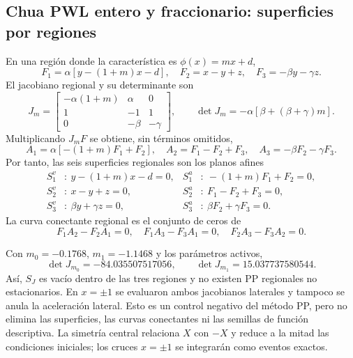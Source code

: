 \subsection{Chua PWL entero y fraccionario: superficies por regiones}
\label{subsec:casegt-chua-pwl}

En una región donde la característica es $\phi(x)=mx+d$,
\begin{equation}
 F_1=\alpha[y-(1+m)x-d],\quad
 F_2=x-y+z,\quad F_3=-\beta y-\gamma z.
 \label{casegt:eq:chua-pwl-field}
\end{equation}
El jacobiano regional y su determinante son
\begin{equation}
 J_m=
 \begin{bmatrix}
 -\alpha(1+m)&\alpha&0\\
 1&-1&1\\
 0&-\beta&-\gamma
 \end{bmatrix},
 \qquad
 \det J_m=-\alpha[\beta+(\beta+\gamma)m].
 \label{casegt:eq:chua-pwl-J}
\end{equation}
Multiplicando $J_mF$ se obtiene, sin términos omitidos,
\begin{equation}
 A_1=\alpha[-(1+m)F_1+F_2],\quad
 A_2=F_1-F_2+F_3,\quad
 A_3=-\beta F_2-\gamma F_3.
 \label{casegt:eq:chua-pwl-A}
\end{equation}
Por tanto, las seis superficies regionales son los planos afines
\begin{align}
 S_1^v&:\ y-(1+m)x-d=0,&
 S_1^a&:\ -(1+m)F_1+F_2=0,\nonumber\\
 S_2^v&:\ x-y+z=0,&
 S_2^a&:\ F_1-F_2+F_3=0,\\
 S_3^v&:\ \beta y+\gamma z=0,&
 S_3^a&:\ \beta F_2+\gamma F_3=0.
 \label{casegt:eq:chua-pwl-surfaces}
\end{align}
La curva conectante regional es el conjunto de ceros de
\begin{equation}
 F_1A_2-F_2A_1=0,
 \quad F_1A_3-F_3A_1=0,
 \quad F_2A_3-F_3A_2=0.
 \label{casegt:eq:chua-pwl-CC}
\end{equation}

Con $m_0=-0.1768$, $m_1=-1.1468$ y los parámetros activos,
\begin{equation}
 \det J_{m_0}=-84.035507517056,
 \qquad
 \det J_{m_1}=15.037737580544.
 \label{casegt:eq:chua-pwl-dets}
\end{equation}
Así, $S_J$ es vacío dentro de las tres regiones y no existen PP regionales no
estacionarios. En $x=\pm1$ se evaluaron ambos jacobianos laterales y tampoco se
anula la aceleración lateral. Esto es un control negativo del método PP, pero
no elimina las superficies, las curvas conectantes ni las semillas de función
descriptiva. La simetría central relaciona $X$ con $-X$ y reduce a la mitad las
condiciones iniciales; los cruces $x=\pm1$ se integrarán como eventos exactos.

